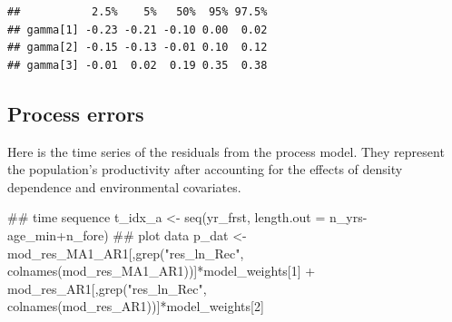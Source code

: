 \documentclass[
  11pt,
]{article}
\newenvironment{Shaded}{}{}
\newcommand{\CommentTok}[1]{\textcolor[rgb]{0.00,0.50,0.00}{#1}}
\newcommand{\DataTypeTok}[1]{#1}
\newcommand{\DecValTok}[1]{#1}
\newcommand{\KeywordTok}[1]{\textcolor[rgb]{0.00,0.00,1.00}{#1}}
\newcommand{\NormalTok}[1]{#1}
\newcommand{\OperatorTok}[1]{#1}
\newcommand{\StringTok}[1]{\textcolor[rgb]{0.00,0.50,0.50}{#1}}
\begin{document}
\begin{verbatim}
##           2.5%    5%   50%  95% 97.5%
## gamma[1] -0.23 -0.21 -0.10 0.00  0.02
## gamma[2] -0.15 -0.13 -0.01 0.10  0.12
## gamma[3] -0.01  0.02  0.19 0.35  0.38
\end{verbatim}

\hypertarget{process-errors}{%
\subsection{Process errors}\label{process-errors}}

Here is the time series of the residuals from the process model. They
represent the population's productivity after accounting for the effects
of density dependence and environmental covariates.

\begin{Shaded}
\begin{Highlighting}[]
\CommentTok{## time sequence}
\NormalTok{t_idx_a <-}\StringTok{ }\KeywordTok{seq}\NormalTok{(yr_frst, }\DataTypeTok{length.out =}\NormalTok{ n_yrs}\OperatorTok{-}\NormalTok{age_min}\OperatorTok{+}\NormalTok{n_fore)}
\CommentTok{## plot data}
\NormalTok{p_dat <-}\StringTok{ }\NormalTok{mod_res_MA1_AR1[,}\KeywordTok{grep}\NormalTok{(}\StringTok{"res_ln_Rec"}\NormalTok{, }\KeywordTok{colnames}\NormalTok{(mod_res_MA1_AR1))]}\OperatorTok{*}\NormalTok{model_weights[}\DecValTok{1}\NormalTok{] }\OperatorTok{+}\StringTok{ }\NormalTok{mod_res_AR1[,}\KeywordTok{grep}\NormalTok{(}\StringTok{"res_ln_Rec"}\NormalTok{, }\KeywordTok{colnames}\NormalTok{(mod_res_AR1))]}\OperatorTok{*}\NormalTok{model_weights[}\DecValTok{2}\NormalTok{] }


\end{Highlighting}
\end{Shaded}
\end{document}
